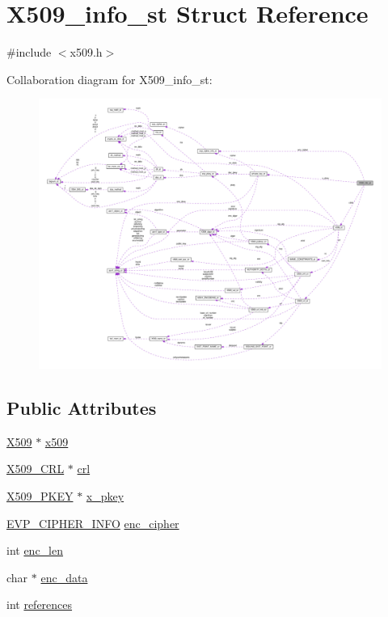 \hypertarget{struct_x509__info__st}{}\section{X509\+\_\+info\+\_\+st Struct Reference}
\label{struct_x509__info__st}


{\ttfamily \#include $<$x509.\+h$>$}



Collaboration diagram for X509\+\_\+info\+\_\+st\+:
\nopagebreak
\begin{figure}[H]
\begin{center}
\leavevmode
\includegraphics[width=350pt]{struct_x509__info__st__coll__graph}
\end{center}
\end{figure}
\subsection*{Public Attributes}
\begin{DoxyCompactItemize}
\item 
\hyperlink{ossl__typ_8h_a4f666bde6518f95deb3050c54b408416}{X509} $\ast$ \hyperlink{struct_x509__info__st_ab25bba431636552ba16640f61c42668c}{x509}
\item 
\hyperlink{ossl__typ_8h_ac8661d2485c2c8da5fd7dd26b846f4bf}{X509\+\_\+\+C\+RL} $\ast$ \hyperlink{struct_x509__info__st_aaf234a243b1abc907de008a71d984330}{crl}
\item 
\hyperlink{x509_8h_a3c6aa7f1ac02d0eadbcd9415cc5ed0e0}{X509\+\_\+\+P\+K\+EY} $\ast$ \hyperlink{struct_x509__info__st_a06456585da668d208076cf6385f177aa}{x\+\_\+pkey}
\item 
\hyperlink{evp_8h_a0ff32d74885621bf0ee4f962602e6c9b}{E\+V\+P\+\_\+\+C\+I\+P\+H\+E\+R\+\_\+\+I\+N\+FO} \hyperlink{struct_x509__info__st_a157d206dc1a125ab2b4c7d166a7de138}{enc\+\_\+cipher}
\item 
int \hyperlink{struct_x509__info__st_a8da5cd22fabb3c72738fabac57bbe64f}{enc\+\_\+len}
\item 
char $\ast$ \hyperlink{struct_x509__info__st_a7b4eaab0048c4e7b6d5a3dd9d70be609}{enc\+\_\+data}
\item 
int \hyperlink{struct_x509__info__st_ab5653bf99a3d84cffed5ec7c52da92e3}{references}
\end{DoxyCompactItemize}


